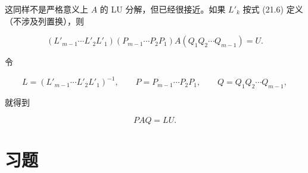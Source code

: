 \documentclass[UTF8,fontset=none,12pt]{ctexart}
\theoremstyle{definition}
\begin{document}
这同样不是严格意义上 $A$ 的 LU 分解，但已经很接近。如果 $L'_k$ 按式 (21.6) 定义（不涉及列置换），则

\begin{equation}
(L'_{m-1}\cdots L'_2L'_1)
(P_{m-1}\cdots P_2P_1)A
(Q_1Q_2\cdots Q_{m-1})=U.
\tag{21.9}
\end{equation}

令

$$
L=(L'_{m-1}\cdots L'_2L'_1)^{-1},
\qquad
P=P_{m-1}\cdots P_2P_1,
\qquad
Q=Q_1Q_2\cdots Q_{m-1},
$$

就得到

\begin{equation}
PAQ=LU.
\tag{21.10}
\end{equation}

\section*{习题}
\end{document}
